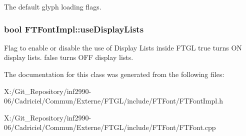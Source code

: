 The default glyph loading flags. \hypertarget{class_f_t_font_impl_a5c21ea909477c7180b86625fef6af457}{
\subsubsection[{use\-Display\-Lists}]{\setlength{\rightskip}{0pt plus 5cm}bool F\-T\-Font\-Impl\-::use\-Display\-Lists\hspace{0.3cm}{\ttfamily [protected]}}}\label{class_f_t_font_impl_a5c21ea909477c7180b86625fef6af457}
Flag to enable or disable the use of Display Lists inside F\-T\-G\-L {\ttfamily true} turns O\-N display lists. {\ttfamily false} turns O\-F\-F display lists. 

The documentation for this class was generated from the following files\-:\begin{DoxyCompactItemize}
\item 
X\-:/\-Git\-\_\-\-Repository/inf2990-\/06/\-Cadriciel/\-Commun/\-Externe/\-F\-T\-G\-L/include/\-F\-T\-Font/F\-T\-Font\-Impl.\-h\item 
X\-:/\-Git\-\_\-\-Repository/inf2990-\/06/\-Cadriciel/\-Commun/\-Externe/\-F\-T\-G\-L/include/\-F\-T\-Font/F\-T\-Font.\-cpp\end{DoxyCompactItemize}

